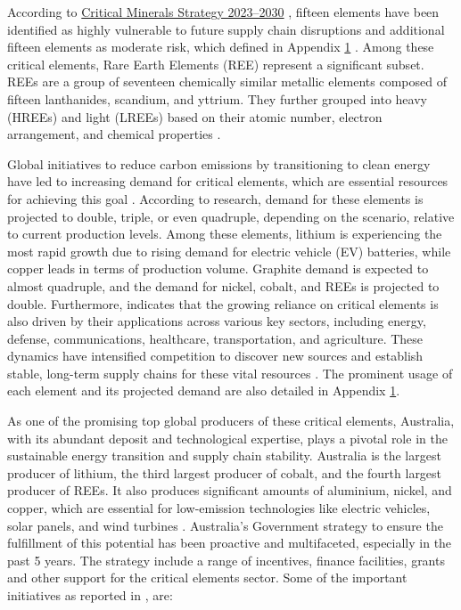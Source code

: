 \documentclass[11pt,a4paper,]{article}
\begin{document}
According to \href{https://www.industry.gov.au/publications/critical-minerals-strategy-2023-2030}{Critical Minerals Strategy 2023--2030} \autocite{geoscience2023}, fifteen elements have been identified as highly vulnerable to future supply chain disruptions and additional fifteen elements as moderate risk, which defined in Appendix \href{\%7B\#appendix-one\%7D}{1} \autocite{Coyne2023,Skirrow2013,IEA2024b,Fortier2018,Austrade2024}. Among these critical elements, Rare Earth Elements (REE) represent a significant subset. REEs are a group of seventeen chemically similar metallic elements composed of fifteen lanthanides, scandium, and yttrium. They further grouped into heavy (HREEs) and light (LREEs) based on their atomic number, electron arrangement, and chemical properties \autocite{Reid2018}.

Global initiatives to reduce carbon emissions by transitioning to clean energy have led to increasing demand for critical elements, which are essential resources for achieving this goal \autocite{IEA2021,Wang2022}. According to \textcite{IEA2024} research, demand for these elements is projected to double, triple, or even quadruple, depending on the scenario, relative to current production levels. Among these elements, lithium is experiencing the most rapid growth due to rising demand for electric vehicle (EV) batteries, while copper leads in terms of production volume. Graphite demand is expected to almost quadruple, and the demand for nickel, cobalt, and REEs is projected to double. Furthermore, \textcite{Fortier2018} indicates that the growing reliance on critical elements is also driven by their applications across various key sectors, including energy, defense, communications, healthcare, transportation, and agriculture. These dynamics have intensified competition to discover new sources and establish stable, long-term supply chains for these vital resources \autocite{Emsbo2021}. The prominent usage of each element and its projected demand are also detailed in Appendix \href{\%7B\#appendix-one\%7D}{1}.

As one of the promising top global producers of these critical elements, Australia, with its abundant deposit and technological expertise, plays a pivotal role in the sustainable energy transition and supply chain stability. Australia is the largest producer of lithium, the third largest producer of cobalt, and the fourth largest producer of REEs. It also produces significant amounts of aluminium, nickel, and copper, which are essential for low-emission technologies like electric vehicles, solar panels, and wind turbines \autocite{DISR2023}. Australia's Government strategy to ensure the fulfillment of this potential has been proactive and multifaceted, especially in the past 5 years. The strategy include a range of incentives, finance facilities, grants and other support for the critical elements sector. Some of the important initiatives as reported in \textcite{DISR2023}, are:
\end{document}
